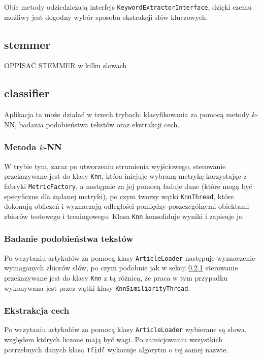 \documentclass{classrep}
\begin{document}
Obie metody odziedziczają interfejs \verb|KeywordExtractorInterface|, dzięki czemu możliwy jest dogodny wybór sposobu ekstrakcji słów kluczowych.

\subsection{stemmer}
{\color{red} OPPISAĆ STEMMER w kilku slowach}

\subsection{classifier}
Aplikacja ta może działać w trzech trybach: klasyfikowania za pomocą metody $k$-NN, badania podobieństwa tekstów oraz ekstrakcji cech.

\subsubsection{Metoda $k$-NN}
\label{sec:impl_knn}
W trybie tym, zaraz po utworzeniu strumienia wyjściowego, sterowanie przekazywane jest do klasy \verb|Knn|, która inicjuje wybraną metrykę korzystając z fabryki \verb|MetricFactory|, a następnie za jej pomocą ładuje dane (które mogą być specyficzne dla żądanej metryki), po czym tworzy wątki \verb|KnnThread|, które dokonują obliczeń i wyznaczają odległości pomiędzy poszczególnymi obiektami zbiorów testowego i treningowego. Klasa \verb|Knn| konsoliduje wyniki i zapisuje je.

\subsubsection{Badanie podobieństwa tekstów}
Po wczytaniu artykułów za pomocą klasy \verb|ArticleLoader| następuje wyznaczenie wymaganych zbiorów słów, po czym podobnie jak w sekcji \ref{sec:impl_knn} sterowanie przekazywane jest do klasy \verb|Knn| z tą różnicą, że praca w tym przypadku wykonywana jest przez wątki klasy \verb|KnnSimiliarityThread|.

\subsubsection{Ekstrakcja cech}
Po wczytaniu artykułów za pomocą klasy \verb|ArticleLoader| wybierane są słowa, względem których liczone mają być wagi. Po zainicjowaniu wszystkich potrzebnych danych klasa \verb|Tfidf| wykonuje algorytm o tej samej nazwie.
\end{document}
